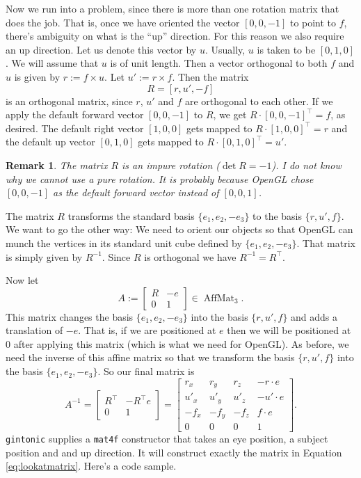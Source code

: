 \documentclass{article}
\newtheorem{remark}[definition]{Remark}
\DeclareMathOperator{\AffMat}{AffMat}
\begin{document}
Now we run into a problem, since there is more than one rotation matrix that does the job. That is, once we have oriented the vector $[0,0,-1]$ to point to $f$, there's ambiguity on what is the ``up'' direction. For this reason we also require an up direction. Let us denote this vector by $u$. Usually, $u$ is taken to be $[0,1,0]$. We will assume that $u$ is of unit length. Then a vector orthogonal to both $f$ and $u$ is given by $r := f \times u$. Let $u' := r \times f$. Then the matrix
\[ R = [r , u' , -f] \]
is an orthogonal matrix, since $r$, $u'$ and $f$ are orthogonal to each other. If we apply the default forward vector $[0,0,-1]$ to $R$, we get $R \cdot [0,0,-1]^\intercal = f$, as desired. The default right vector $[1,0,0]$ gets mapped to $R \cdot [1,0,0]^\intercal = r$ and the default up vector $[0,1,0]$ gets mapped to $R \cdot [0,1,0]^\intercal = u'$.

\begin{remark}
The matrix $R$ is an impure rotation ($\det R = -1$). I do not know why we cannot use a pure rotation. It is probably because OpenGL chose $[0,0,-1]$ as the default forward vector instead of $[0,0,1]$.
\end{remark}

The matrix $R$ transforms the standard basis $\{e_1, e_2, -e_3\}$ to the basis $\{r,u',f\}$. We want to go the other way: We need to orient our objects so that OpenGL can munch the vertices in its standard unit cube defined by $\{e_1, e_2, -e_3\}$. That matrix is simply given by $R^{-1}$. Since $R$ is orthogonal we have $R^{-1} = R^\intercal$.

Now let
\[ A := \begin{bmatrix} R & -e \\ 0 & 1 \end{bmatrix} \in \AffMat_3. \]
This matrix changes the basis $\{e_1, e_2, -e_3\}$ into the basis $\{r,u',f\}$ and adds a translation of $-e$. That is, if we are positioned at $e$ then we will be positioned at $0$ after applying this matrix (which is what we need for OpenGL). As before, we need the inverse of this affine matrix so that we transform the basis $\{r,u',f\}$ into the basis $\{e_1,e_2,-e_3\}$. So our final matrix is
\begin{equation} \label{eq:lookatmatrix} A^{-1} = \begin{bmatrix} R^\intercal & -R^\intercal e \\ 0 & 1 \end{bmatrix} 
= \begin{bmatrix}
r_x & r_y & r_z & - r \cdot e \\
u'_x & u'_y & u'_z & - u' \cdot e \\
-f_x & -f_y & -f_z & f \cdot e \\
0 & 0 & 0 & 1
\end{bmatrix}. \end{equation}
\texttt{gintonic} supplies a \texttt{mat4f} constructor that takes an eye position, a subject position and and up direction. It will construct exactly the matrix in Equation \ref{eq:lookatmatrix}. Here's a code sample.
\end{document}
